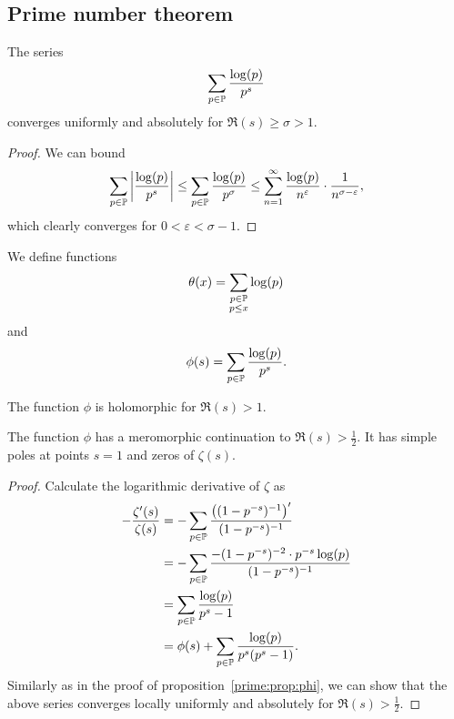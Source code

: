 \newpage

\subsection{Prime number theorem}

\begin{trditev}
\label{prime:prop:phi}
The series
\[
\sum_{p \in \P} \frac{\log(p)}{p^s}
\]
converges uniformly and absolutely for $\Re(s) \geq \sigma > 1$.
\end{trditev}

\begin{proof}
We can bound
\[
\sum_{p \in \P} \abs{\frac{\log(p)}{p^s}} \leq
\sum_{p \in \P} \frac{\log(p)}{p^\sigma} \leq
\sum_{n=1}^\infty \frac{\log(p)}{n^\varepsilon} \cdot
\frac{1}{n^{\sigma-\varepsilon}},
\]
which clearly converges for $0 < \varepsilon < \sigma-1$.
\end{proof}

\begin{definicija}
We define functions
\[
\theta(x) =
\sum_{\substack{p \in \P \\ p \leq x}} \log(p)
\]
and
\[
\phi(s) = \sum_{p \in \P} \frac{\log(p)}{p^s}.
\]
\end{definicija}

\begin{opomba}
The function $\phi$ is holomorphic for $\Re(s) > 1$.
\end{opomba}

\begin{trditev}
The function $\phi$ has a meromorphic continuation to
$\Re(s) > \frac{1}{2}$. It has simple poles at points $s=1$ and
zeros of $\zeta(s)$.
\end{trditev}

\begin{proof}
Calculate the logarithmic derivative of $\zeta$ as
\begin{align*}
- \frac{\zeta'(s)}{\zeta(s)} &=
-\sum_{p \in \P} \frac{\br{(1-p^{-s})^{-1}}'}{(1-p^{-s})^{-1}}
\\
&=
-\sum_{p \in \P}
\frac{-(1-p^{-s})^{-2} \cdot p^{-s} \log(p)}{(1-p^{-s})^{-1}}
\\
&=
\sum_{p \in \P} \frac{\log(p)}{p^s-1}
\\
&=
\phi(s) + \sum_{p \in \P} \frac{\log(p)}{p^s(p^s-1)}.
\end{align*}
Similarly as in the proof of proposition~\ref{prime:prop:phi}, we
can show that the above series converges locally uniformly and
absolutely for $\Re(s) > \frac{1}{2}$.
\end{proof}

